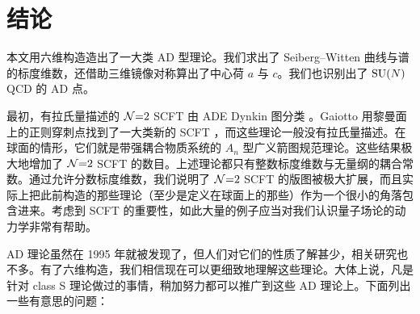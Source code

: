 \section{结论}
\label{sec:concl}

本文用六维构造造出了一大类 AD 型理论。我们求出了 Seiberg--Witten 曲线与谱的标度维数，还借助三维镜像对称算出了中心荷 $a$ 与 $c$。我们也识别出了 $\operatorname{SU}(N)$ QCD 的 AD 点。

最初，有拉氏量描述的 $\mathcal{N}{=}2$ SCFT 由 ADE Dynkin 图分类 \cite{49}。Gaiotto 用黎曼面上的正则穿刺点找到了一大类新的 SCFT \cite{2}，而这些理论一般没有拉氏量描述。在球面的情形，它们就是带强耦合物质系统的 $A_n$ 型广义箭图规范理论。这些结果极大地增加了 $\mathcal{N}{=}2$ SCFT 的数目。上述理论都只有整数标度维数与无量纲的耦合常数。通过允许分数标度维数，我们说明了 $\mathcal{N}{=}2$ SCFT 的版图被极大扩展，而且实际上把此前构造的那些理论（至少是定义在球面上的那些）作为一个很小的角落包含进来。考虑到 SCFT 的重要性，如此大量的例子应当对我们认识量子场论的动力学非常有帮助。

AD 理论虽然在 1995 年就被发现了，但人们对它们的性质了解甚少，相关研究也不多。有了六维构造，我们相信现在可以更细致地理解这些理论。大体上说，凡是针对 class S 理论做过的事情，稍加努力都可以推广到这些 AD 理论上。下面列出一些有意思的问题：

